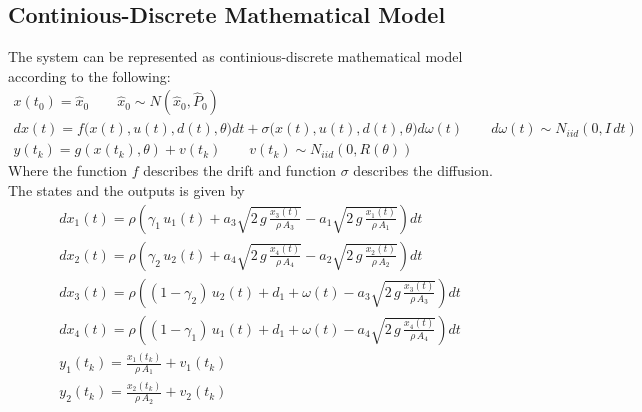 \subsection{Continious-Discrete Mathematical Model}
The system can be represented as continious-discrete mathematical model according to the following:
\begin{equation}
    \begin{gathered}
        x(t_0)=\hat{x}_0 \qquad \hat{x}_0\sim N(\hat{x}_0,\hat{P}_0)\\
        dx(t)=f\Big(x(t),u(t),d(t),\theta\Big)dt+\sigma\Big(x(t),u(t),d(t),\theta\Big)d\omega(t) \qquad d\omega(t)\sim N_{iid}(0,I\,dt)\\
        y(t_k)=g(x(t_k),\theta)+v(t_k)\qquad v(t_k)\sim N_{iid}(0,R(\theta))
    \end{gathered}
\end{equation}
Where the function $f$ describes the drift and function $\sigma$ describes the diffusion. The states and the outputs is given by
\begin{equation}
    \begin{gathered}
        dx_1(t)=\rho\left(\gamma_1\,u_1(t)+a_3\sqrt{2\,g\,\frac{x_3(t)}{\rho\,A_3}}-a_1\sqrt{2\,g\,\frac{x_1(t)}{\rho\,A_1}}\right)dt\\
        dx_2(t)=\rho\left(\gamma_2\,u_2(t)+a_4\sqrt{2\,g\,\frac{x_4(t)}{\rho\,A_4}}-a_2\sqrt{2\,g\,\frac{x_2(t)}{\rho\,A_2}}\right)dt\\
        dx_3(t)=\rho\left((1-\gamma_2)\,u_2(t)+d_1+\omega(t)-a_3\sqrt{2\,g\,\frac{x_3(t)}{\rho\,A_3}}\right)dt\\
        dx_4(t)=\rho\left((1-\gamma_1)\,u_1(t)+d_1+\omega(t)-a_4\sqrt{2\,g\,\frac{x_4(t)}{\rho\,A_4}}\right)dt\\
        y_1(t_k)=\frac{x_1(t_k)}{\rho\,A_1}+v_1(t_k)\\
        y_2(t_k)=\frac{x_2(t_k)}{\rho\,A_2}+v_2(t_k)
    \end{gathered}
\end{equation}